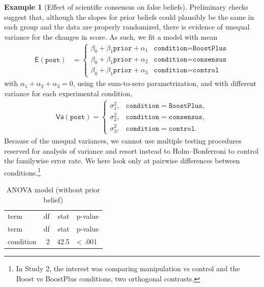 \documentclass[
  11pt,
  letterpaper,
]{scrbook}
\theoremstyle{definition}
\newtheorem{example}{Example}[chapter]
\theoremstyle{definition}
\theoremstyle{remark}
\begin{document}
\begin{example}[Effect of scientific consensus on false
beliefs]
Preliminary checks suggest that, although the slopes for prior beliefs
could plausibly be the same in each group and the data are properly
randomized, there is evidence of unequal variance for the changes in
score. As such, we fit a model with mean \begin{align*}
\mathsf{E}(\texttt{post}) &= \begin{cases}
\beta_0 + \beta_1 \texttt{prior} + \alpha_1 &  \texttt{condition} = \texttt{BoostPlus}\\
\beta_0 + \beta_1 \texttt{prior} + \alpha_2 &\texttt{condition} = \texttt{consensus}\\
\beta_0 + \beta_1 \texttt{prior} + \alpha_3 &\texttt{condition} = \texttt{control}
\end{cases}
\end{align*} with \(\alpha_1 + \alpha_2 + \alpha_3=0\), using the
sum-to-zero parametrization, and with different variance for each
experimental condition, \begin{align*}
\mathsf{Va}(\texttt{post}) = \begin{cases}
\sigma^2_1, &  \texttt{condition} = \texttt{BoostPlus},\\
\sigma^2_2, &  \texttt{condition} = \texttt{consensus},\\
\sigma^2_3, & \texttt{condition} = \texttt{control}.
\end{cases}
\end{align*} Because of the unequal variances, we cannot use multiple
testing procedures reserved for analysis of variance and resort instead
to Holm--Bonferroni to control the familywise error rate. We here look
only at pairwise differences between conditions.\footnote{In Study 2,
  the interest was comparing manipulation vs control and the Boost vs
  BoostPlus conditions, two orthogonal contrasts.}

\begin{longtable}[]{@{}lrrl@{}}

\caption{\label{tbl-anovatabSSVB}Analysis of variance tables}

\tabularnewline

\caption{ANOVA model (without prior belief)}\tabularnewline
\toprule\noalign{}
term & df & stat & p-value \\
\midrule\noalign{}
\endfirsthead
\toprule\noalign{}
term & df & stat & p-value \\
\midrule\noalign{}
\endhead
\bottomrule\noalign{}
\endlastfoot
condition & 2 & 42.5 & \textless{} .001 \\


\end{longtable}
\end{example}
\end{document}
